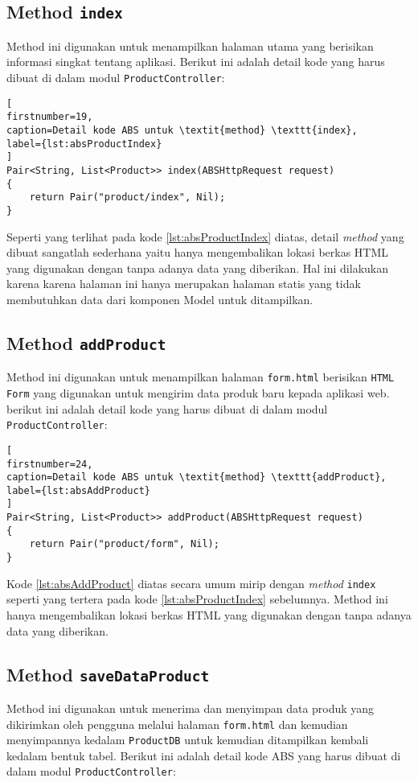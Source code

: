 \subsection{Method \texttt{index}}
Method ini digunakan untuk menampilkan halaman utama yang berisikan informasi singkat tentang aplikasi. Berikut ini adalah detail kode yang harus dibuat di dalam modul \texttt{ProductController}:

\begin{lstlisting}[
firstnumber=19,
caption=Detail kode ABS untuk \textit{method} \texttt{index},
label={lst:absProductIndex}
]
Pair<String, List<Product>> index(ABSHttpRequest request)
{
	return Pair("product/index", Nil);
}
\end{lstlisting}

Seperti yang terlihat pada kode \ref{lst:absProductIndex} diatas, detail \textit{method} yang dibuat sangatlah sederhana yaitu hanya mengembalikan lokasi berkas HTML yang digunakan dengan tanpa adanya data yang  diberikan. Hal ini dilakukan karena karena halaman ini hanya merupakan halaman statis yang tidak membutuhkan data dari komponen Model untuk ditampilkan.

\subsection{Method \texttt{addProduct}}
Method ini digunakan untuk menampilkan halaman \texttt{form.html} berisikan \texttt{HTML Form} yang digunakan untuk mengirim data produk baru kepada aplikasi web. berikut ini adalah detail kode yang harus dibuat di dalam modul \texttt{ProductController}:

\begin{lstlisting}[
firstnumber=24,
caption=Detail kode ABS untuk \textit{method} \texttt{addProduct},
label={lst:absAddProduct}
]
Pair<String, List<Product>> addProduct(ABSHttpRequest request)
{
	return Pair("product/form", Nil);
}
\end{lstlisting}

Kode \ref{lst:absAddProduct} diatas secara umum mirip dengan \textit{method} \texttt{index} seperti yang tertera pada kode \ref{lst:absProductIndex} sebelumnya. Method ini hanya mengembalikan lokasi berkas HTML yang digunakan dengan tanpa adanya data yang diberikan. 

\subsection{Method \texttt{saveDataProduct}}
Method ini digunakan untuk menerima dan menyimpan data produk yang dikirimkan oleh pengguna melalui halaman \texttt{form.html} dan kemudian menyimpannya kedalam \texttt{ProductDB} untuk kemudian ditampilkan kembali kedalam bentuk tabel. Berikut ini adalah detail kode ABS yang harus dibuat di dalam modul \texttt{ProductController}:

